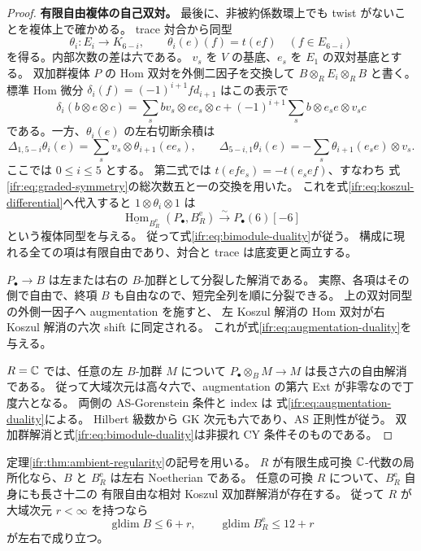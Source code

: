 \begin{proof}
\textbf{有限自由複体の自己双対。}
最後に、非被約係数環上でも twist がないことを複体上で確かめる。
trace 対合から同型
\[
 \theta_i:E_i\longrightarrow K_{6-i},\qquad
          \theta_i(e)(f)=t(ef)\quad(f\in E_{6-i})
\]
を得る。内部次数の差は六である。
$v_s$ を $V$ の基底、$e_s$ を $E_1$ の双対基底とする。
双加群複体 $P$ の Hom 双対を外側二因子を交換して
$B\otimes_RE_i\otimes_RB$ と書く。
標準 Hom 微分 $\delta_i(f)=(-1)^{i+1}f d_{i+1}$ はこの表示で
\[
 \delta_i(b\otimes e\otimes c)=
  \sum_s bv_s\otimes ee_s\otimes c
       +(-1)^{i+1}\sum_s b\otimes e_se\otimes v_sc
\]
である。一方、$\theta_i(e)$ の左右切断余積は
\[
 \Delta_{1,5-i}\theta_i(e)
       =\sum_s v_s\otimes\theta_{i+1}(ee_s),\qquad
 \Delta_{5-i,1}\theta_i(e)
       =-\sum_s\theta_{i+1}(e_se)\otimes v_s.
\]
ここでは $0\le i\le5$ とする。
第二式では $t(efe_s)=-t(e_sef)$、すなわち
式\eqref{ifr:eq:graded-symmetry}の総次数五と一の交換を用いた。
これを式\eqref{ifr:eq:koszul-differential}へ代入すると
$1\otimes\theta_i\otimes1$ は
\[
 \underline{\operatorname{Hom}}_{B_R^{\mathrm e}}(P_\bullet,B_R^{\mathrm e})
                     \xrightarrow{\sim}P_\bullet(6)[-6]
\]
という複体同型を与える。
従って式\eqref{ifr:eq:bimodule-duality}が従う。
構成に現れる全ての項は有限自由であり、対合と trace は底変更と両立する。

$P_\bullet\to B$ は左または右の $B$-加群として分裂した解消である。
実際、各項はその側で自由で、終項 $B$ も自由なので、短完全列を順に分裂できる。
上の双対同型の外側一因子へ augmentation を施すと、
左 Koszul 解消の Hom 双対が右 Koszul 解消の六次 shift に同定される。
これが式\eqref{ifr:eq:augmentation-duality}を与える。

$R=\mathbb C$ では、任意の左 $B$-加群 $M$ について
$P_\bullet\otimes_BM\to M$ は長さ六の自由解消である。
従って大域次元は高々六で、augmentation の第六 Ext が非零なので丁度六となる。
両側の AS-Gorenstein 条件と index は
式\eqref{ifr:eq:augmentation-duality}による。
Hilbert 級数から GK 次元も六であり、AS 正則性が従う。
双加群解消と式\eqref{ifr:eq:bimodule-duality}は非捩れ CY 条件そのものである。
\end{proof}

\begin{corollary}
\label{ifr:cor:noetherian-envelope}
定理\ref{ifr:thm:ambient-regularity}の記号を用いる。
$R$ が有限生成可換 $\mathbb C$-代数の局所化なら、$B$ と $B_R^{\mathrm e}$ は左右 Noetherian である。
任意の可換 $R$ について、$B_R^{\mathrm e}$ 自身にも長さ十二の
有限自由な相対 Koszul 双加群解消が存在する。
従って $R$ が大域次元 $r<\infty$ を持つなら
\[
 \operatorname{gldim} B\le6+r,\qquad
 \operatorname{gldim} B_R^{\mathrm e}\le12+r
\]
が左右で成り立つ。
\end{corollary}

